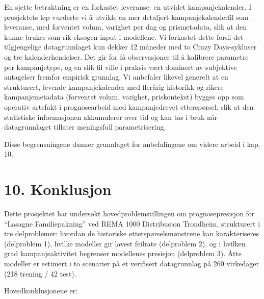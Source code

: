 \documentclass[
  norsk,
  11pt,
  a4paper,
]{article}
\begin{document}
En sjette betraktning er en forkastet leveranse: en utvidet
kampanjekalender. I prosjektets løp vurderte vi å utvikle en mer
detaljert kampanjekalenderfil som leveranse, med forventet volum,
varighet per dag og prismetadata, slik at den kunne brukes som rik
eksogen input i modellene. Vi forkastet dette fordi det tilgjengelige
datagrunnlaget kun dekker 12 måneder med to Crazy Days-sykluser og tre
kalenderhendelser. Det gir for få observasjoner til å kalibrere
parametre per kampanjetype, og en slik fil ville i praksis vært dominert
av subjektive antagelser fremfor empirisk grunnlag. Vi anbefaler likevel
generelt at en strukturert, levende kampanjekalender med flerårig
historikk og rikere kampanjemetadata (forventet volum, varighet,
priskontekst) bygges opp som operativ artefakt i prognosearbeid med
kampanjedrevet etterspørsel, slik at den statistiske informasjonen
akkumulerer over tid og kan tas i bruk når datagrunnlaget tillater
meningsfull parametrisering.

Disse begrensningene danner grunnlaget for anbefalingene om videre
arbeid i kap. 10.

\section{10. Konklusjon}\label{konklusjon}

Dette prosjektet har undersøkt hovedproblemstillingen om
prognosepresisjon for ``Lasagne Familiepakning'' ved REMA 1000
Distribusjon Trondheim, strukturert i tre delproblemer: hvordan de
historiske etterspørselsmønstrene kan karakteriseres (delproblem 1),
hvilke modeller gir lavest feilrate (delproblem 2), og i hvilken grad
kampanjeaktivitet begrenser modellenes presisjon (delproblem 3). Åtte
modeller er estimert i to scenarier på et verifisert datagrunnlag på 260
virkedager (218 trening / 42 test).

Hovedkonklusjonene er:
\end{document}

